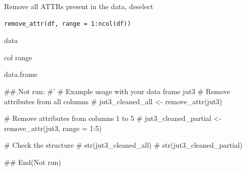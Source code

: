 \documentclass[a4paper]{book}
\begin{document}
%
\begin{Description}
Remove all ATTRs present in the data, deselect
\end{Description}
%
\begin{Usage}
\begin{verbatim}
remove_attr(df, range = 1:ncol(df))
\end{verbatim}
\end{Usage}
%
\begin{Arguments}
\begin{ldescription}
\item[\code{df}] data

\item[\code{range}] col range
\end{ldescription}
\end{Arguments}
%
\begin{Value}
data.frame
\end{Value}
%
\begin{Examples}
\begin{ExampleCode}

\#\# Not run: 
#'
# Example usage with your data frame jut3
# Remove attributes from all columns
# jut3_cleaned_all <- remove_attr(jut3)

# Remove attributes from columns 1 to 5
# jut3_cleaned_partial <- remove_attr(jut3, range = 1:5)

# Check the structure
# str(jut3_cleaned_all)
# str(jut3_cleaned_partial)

## End(Not run)


\end{ExampleCode}
\end{Examples}
\end{document}
